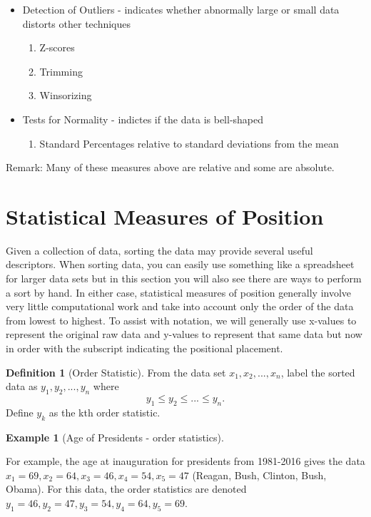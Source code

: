 \documentclass[10pt,]{book}
\theoremstyle{plain}
\theoremstyle{definition}
\newtheorem{definition}[theorem]{Definition}
\theoremstyle{definition}
\newtheorem{example}[theorem]{Example}
\theoremstyle{definition}
\numberwithin{equation}{section}
\begin{document}
\begin{itemize}[label=\textbullet]
\begin{itemize}[label=$\circ$]
\begin{enumerate}
\item\hypertarget{li-26}{}Coefficient of Kurtosis%
\end{enumerate}
\item{}Detection of Outliers 
			- indicates whether abnormally large or small data distorts other 
			techniques%
%
\begin{enumerate}
\item\hypertarget{li-28}{}Z-scores%
\item\hypertarget{li-29}{}Trimming%
\item\hypertarget{li-30}{}Winsorizing%
\end{enumerate}
\item{}Tests for Normality 
			- indictes if the data is bell-shaped%
%
\begin{enumerate}
\item\hypertarget{li-32}{}Standard Percentages relative to standard deviations from the mean%
\end{enumerate}
\end{itemize}
\end{itemize}
\par
Remark: Many of these measures above are relative and some are absolute.%
\typeout{************************************************}
\typeout{************************************************}
\section[{Statistical Measures of Position}]{Statistical Measures of Position}\label{section-3}
Given a collection of data, sorting the data may provide several useful descriptors. When sorting data, you can easily use something like a spreadsheet for larger data sets but in this section you will also see there are ways to perform a sort by hand. In either case, statistical measures of position generally involve very little computational work and take into account only the order of the data from lowest to highest.  To assist with notation, we will generally use x-values to represent the original raw data and y-values to represent that same data but now in order with the subscript indicating the positional placement.
\begin{definition}[{Order Statistic}]\label{definition-1}
From the data set \(x_1, x_2, ... , x_n\), label the sorted data as \(y_1, y_2, ..., y_n\) where  
	\begin{equation*} y_1 \le y_2 \le ... \le y_n.\end{equation*} 
	Define \(y_k\) as the kth order statistic. %
\end{definition}
\begin{example}[Age of Presidents - order statistics]\label{example-1}

	For example, the age at inauguration for presidents from 1981-2016 gives the data \(x_1 = 69, x_2 = 64, x_3 = 46, x_4 = 54, x_5 = 47\) (Reagan, Bush, Clinton, Bush, Obama). For this data, the order statistics are denoted \(y_1 = 46, y_2 = 47, y_3 = 54, y_4 = 64, y_5 = 69\).
\end{example}
\par
\end{document}
